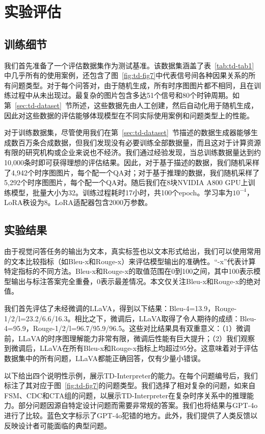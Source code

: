 \section{实验评估}\label{sec:td-experiment}

\subsection{训练细节}

我们首先准备了一个评估数据集作为测试基准。该数据集涵盖了表~\ref{tab:td-tab1}中几乎所有的使用案例，还包含了图~\ref{fig:td-fig7}中代表信号间各种因果关系的所有问题类型。对于每个问答对，由于随机生成，所有时序图图片都不相同，且在训练过程中从未出现过。最复杂的图片包含多达51个信号和80个时钟周期。如第~\ref{sec:td-dataset}~节所述，这些数据先由人工创建，然后自动化用于随机生成，因此对这些数据的评估能够体现模型在不同实际使用案例和问题类型上的性能。

对于训练数据集，尽管使用我们在第~\ref{sec:td-dataset}~节描述的数据生成器能够生成数百万条合成数据，但我们发现没有必要训练全部数据量，而且这对于计算资源有限的研究机构或企业来说也不经济。我们通过经验发现，当总训练数据量达到约10,000条时即可获得理想的评估结果。因此，对于基于描述的数据，我们随机采样了4,942个时序图图片，每个配一个QA对；对于基于推理的数据，我们随机采样了5,292个时序图图片，每个配一个QA对。随后我们在8块NVIDIA A800 GPU上训练模型，批量大小为32。训练过程耗时17小时，共100个epoch。学习率为$10^{-4}$，LoRA秩设为8。LoRA适配器包含2000万参数。

\subsection{实验结果}

由于视觉问答任务的输出为文本，真实标签也以文本形式给出，我们可以使用常用的文本比较指标（如Bleu-x和Rouge-x）来评估模型输出的准确性。“-x”代表计算特定指标的不同方法。Bleu-x和Rouge-x的取值范围在0到100之间，其中100表示模型输出与标注答案完全重叠，0表示最差情况。本文仅关注Bleu-x和Rouge-x的绝对值。

我们首先评估了未经微调的LLaVA，得到以下结果：Bleu-4=13.9，Rouge-1/2/l=23.2/6.6/16.3。相比之下，微调后，LLaVA取得了令人期待的成绩：Bleu-4=95.9，Rouge-1/2/l=96.7/95.9/96.5。这些对比结果具有双重意义：（1）微调前，LLaVA的时序图理解能力非常有限，微调后性能有巨大提升；（2）我们观察到微调后，LLaVA在所有Bleu-x和Rouge-x指标上均超过95分。这意味着对于评估数据集中的所有问题，LLaVA都能正确回答，仅有少量小错误。

以下给出四个说明性示例，展示TD-Interpreter的能力。在每个问题编号后，我们标注了其对应于图~\ref{fig:td-fig7}的问题类型。我们选择了相对复杂的问题，如来自FSM、CDC和CTA组的问题，以展示TD-Interpreter在复杂时序关系中的推理能力。部分问题因源自特定设计问题而需要非常规的答案。我们也将结果与GPT-4o进行了比较。蓝色文字标示了GPT-4o犯错的地方。此外，我们提供了人类反馈以反映设计者可能面临的典型问题。

